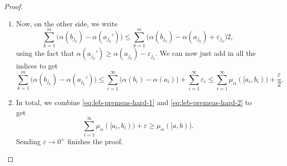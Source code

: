 \documentclass[../notes.tex]{subfiles}
\begin{document}
\begin{proof}
\begin{itemize}
\begin{enumerate}
			\item Now, on the other side, we write
			\[\sum_{k=1}^m\big(\alpha(b_{j_k})-\alpha(a_{j_k}')\big)\le\sum_{k=1}^m\big(\alpha(b_{j_k})-\alpha(a_{j_k})+\varepsilon_{j_k}\big)2,\]
			using the fact that $\alpha(a_{j_k}')\ge\alpha(a_{j_k})-\varepsilon_{j_k}$. We can now just add in all the indices to get
			\begin{equation}
				\sum_{k=1}^m\big(\alpha(b_{j_k})-\alpha(a_{j_k}')\big)\le\sum_{i=1}^\infty\big(\alpha(b_{i})-\alpha(a_{i})\big)+\sum_{i=1}^\infty\varepsilon_i\le\sum_{i=1}^\infty\mu_\alpha([a_i,b_{i}))+\frac\varepsilon2. \label{eq:leb-premeas-hard-2}
			\end{equation}
			
			\item In total, we combine \autoref{eq:leb-premeas-hard-1} and \autoref{eq:leb-premeas-hard-2} to get
			\[\sum_{i=1}^\infty\mu_\alpha([a_{i},b_{i}))+\varepsilon\ge\mu_\alpha([a,b)).\]
			Sending $\varepsilon\to0^+$ finishes the proof.
			\qedhere
		\end{enumerate}
	\end{itemize}
\end{proof}
\end{document}
